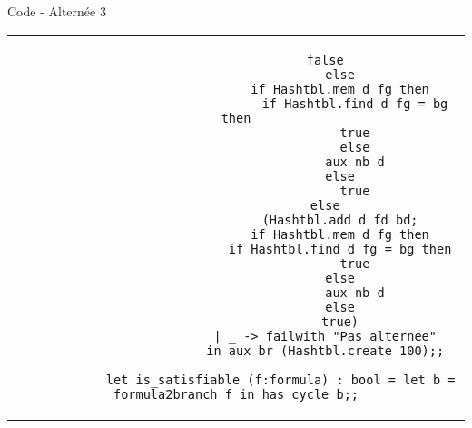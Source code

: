 \documentclass[]{beamer}
\begin{document}
\begin{frame}[fragile]{Code - Alternée 3}
    \begin{center}
        \begin{tabular}{c}
            \begin{lstlisting}
                        false
                            else
                            if Hashtbl.mem d fg then
                                if Hashtbl.find d fg = bg then
                                true
                                else
                                aux nb d
                            else
                                true
                        else
                            (Hashtbl.add d fd bd;
                            if Hashtbl.mem d fg then
                            if Hashtbl.find d fg = bg then
                                true
                            else
                                aux nb d
                            else
                            true)
                        | _ -> failwith "Pas alternee"
                        in aux br (Hashtbl.create 100);;
          
            let is_satisfiable (f:formula) : bool = let b = formula2branch f in has_cycle b;;
            \end{lstlisting}
        \end{tabular}
    \end{center}   
\end{frame}
\end{document}
